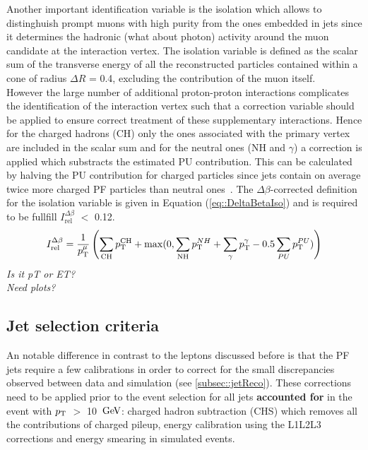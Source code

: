Another important identification variable is the isolation which allows to distinghuish prompt muons with high purity from the ones embedded in jets since it determines the hadronic (what about photon) activity around the muon candidate at the interaction vertex. %
The isolation variable is defined as the scalar sum of the transverse energy of all the reconstructed particles contained within a cone of radius $\Delta R$ = 0.4, excluding the contribution of the muon itself.
\\
However the large number of additional proton-proton interactions complicates the identification of the interaction vertex such that a correction variable should be applied to ensure correct treatment of these supplementary interactions. Hence for the charged hadrons (CH) only the ones associated with the primary vertex are included in the scalar sum and for the neutral ones (NH and $\gamma$) a correction is applied which substracts the estimated PU contribution. This can be calculated by halving the PU contribution for charged particles since jets contain on average twice more charged PF particles than neutral ones~\cite{CHContrVsN}.
The $\Delta \beta$-corrected definition for the isolation variable is given in Equation (\ref{eq::DeltaBetaIso}) and is required to be fullfill $I_{\textrm{rel}}^{\Delta \beta}$ $<$ 0.12.
\begin{equation}\label{eq::DeltaBetaIso}
 I_{\textrm{rel}}^{\Delta \beta} = \frac{1}{p_{\rm T}^{\mu}} \left( \sum_{\textrm{CH}} p_{\rm T}^{\textrm{CH}} + \max(0, \sum_{\textrm{NH}} p_{\rm T}^{NH} + \sum_{\gamma} p_{\rm T}^{\gamma} - 0.5 \sum_{PU} p_{\rm T}^{PU}) \right)
\end{equation}
\textit{Is it pT or ET?}\\
\textit{Need plots?}

\subsection{Jet selection criteria}
An notable difference in contrast to the leptons discussed before is that the PF jets require a few calibrations in order to correct for the small discrepancies observed between data and simulation (see \ref{subsec::jetReco}). These corrections need to be applied prior to the event selection for all jets \textbf{accounted for} in the event with $p_{\rm T}$ $>$ 10 $\, \mathrm{GeV}$: charged hadron subtraction (CHS) which removes all the contributions of charged pileup, energy calibration using the L1L2L3 corrections and energy smearing in simulated events.
\\

